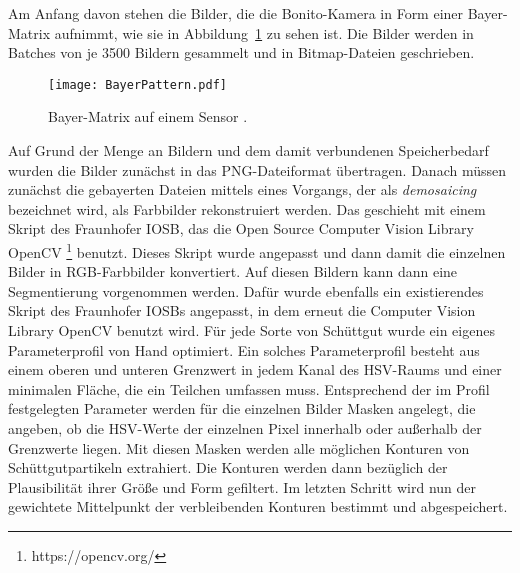 Am Anfang davon stehen die Bilder, die die Bonito-Kamera in Form einer Bayer-Matrix aufnimmt, wie sie in Abbildung~\ref{fig:bayerPattern} zu sehen ist.
Die Bilder werden in Batches von je 3500 Bildern gesammelt und in Bitmap-Dateien geschrieben.
\begin{figure}[h]
	\centering
	\texttt{[image: BayerPattern.pdf]}
	\caption{Bayer-Matrix auf einem Sensor \cite{bayerPattern06}.}
	\label{fig:bayerPattern}
\end{figure}
Auf Grund der Menge an Bildern und dem damit verbundenen Speicherbedarf wurden die Bilder zunächst in das PNG-Dateiformat übertragen.
Danach müssen zunächst die gebayerten Dateien mittels eines Vorgangs, der als \textit{demosaicing} bezeichnet wird,
als Farbbilder rekonstruiert werden.
Das geschieht mit einem Skript des Fraunhofer IOSB, das die Open Source Computer Vision Library OpenCV \footnote{https://opencv.org/} benutzt.
Dieses Skript wurde angepasst und dann damit die einzelnen Bilder in RGB-Farbbilder konvertiert.
Auf diesen Bildern kann dann eine Segmentierung vorgenommen werden.
Dafür wurde ebenfalls ein existierendes Skript des Fraunhofer IOSBs angepasst, in dem erneut die Computer Vision Library OpenCV benutzt wird.
Für jede Sorte von Schüttgut wurde ein eigenes Parameterprofil von Hand optimiert.
Ein solches Parameterprofil besteht aus einem oberen und unteren Grenzwert in jedem Kanal des HSV-Raums und einer minimalen Fläche, die ein Teilchen umfassen muss.
Entsprechend der im Profil festgelegten Parameter werden für die einzelnen Bilder Masken angelegt,
die angeben, ob die HSV-Werte der einzelnen Pixel innerhalb oder außerhalb der Grenzwerte liegen. 
Mit diesen Masken werden alle möglichen Konturen von Schüttgutpartikeln extrahiert. 
Die Konturen werden dann bezüglich der Plausibilität ihrer Größe und Form gefiltert. 
Im letzten Schritt wird nun der gewichtete Mittelpunkt der verbleibenden Konturen bestimmt und abgespeichert.


